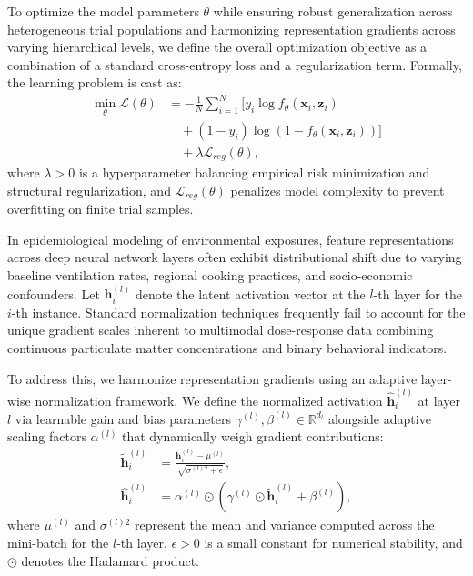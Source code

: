 \documentclass[10pt,twocolumn]{article}
\begin{document}
To optimize the model parameters $\theta$ while ensuring robust generalization across heterogeneous trial populations and harmonizing representation gradients across varying hierarchical levels, we define the overall optimization objective as a combination of a standard cross-entropy loss and a regularization term. Formally, the learning problem is cast as:
\begin{equation}
\begin{aligned}
\min_{\theta} \mathcal{L}(\theta) &= -\frac{1}{N} \sum_{i=1}^{N} \Big[ y_i \log f_\theta(\mathbf{x}_i, \mathbf{z}_i) \\
&\quad + (1 - y_i) \log \left(1 - f_\theta(\mathbf{x}_i, \mathbf{z}_i)\right) \Big] \\
&\quad + \lambda \mathcal{L}_{reg}(\theta),
\end{aligned}
\end{equation}
where $\lambda > 0$ is a hyperparameter balancing empirical risk minimization and structural regularization, and $\mathcal{L}_{reg}(\theta)$ penalizes model complexity to prevent overfitting on finite trial samples.


In epidemiological modeling of environmental exposures, feature representations across deep neural network layers often exhibit distributional shift due to varying baseline ventilation rates, regional cooking practices, and socio-economic confounders. Let $\mathbf{h}^{(l)}_i$ denote the latent activation vector at the $l$-th layer for the $i$-th instance. Standard normalization techniques frequently fail to account for the unique gradient scales inherent to multimodal dose-response data combining continuous particulate matter concentrations and binary behavioral indicators.

To address this, we harmonize representation gradients using an adaptive layer-wise normalization framework. We define the normalized activation $\hat{\mathbf{h}}^{(l)}_i$ at layer $l$ via learnable gain and bias parameters $\gamma^{(l)}, \beta^{(l)} \in \mathbb{R}^{d_l}$ alongside adaptive scaling factors $\alpha^{(l)}$ that dynamically weigh gradient contributions:
\begin{equation}
\begin{aligned}
\tilde{\mathbf{h}}^{(l)}_i &= \frac{\mathbf{h}^{(l)}_i - \mu^{(l)}}{\sqrt{\sigma^{(l)2} + \epsilon}}, \\
\hat{\mathbf{h}}^{(l)}_i &= \alpha^{(l)} \odot \left( \gamma^{(l)} \odot \tilde{\mathbf{h}}^{(l)}_i + \beta^{(l)} \right),
\end{aligned}
\end{equation}
where $\mu^{(l)}$ and $\sigma^{(l)2}$ represent the mean and variance computed across the mini-batch for the $l$-th layer, $\epsilon > 0$ is a small constant for numerical stability, and $\odot$ denotes the Hadamard product. 
\end{document}
